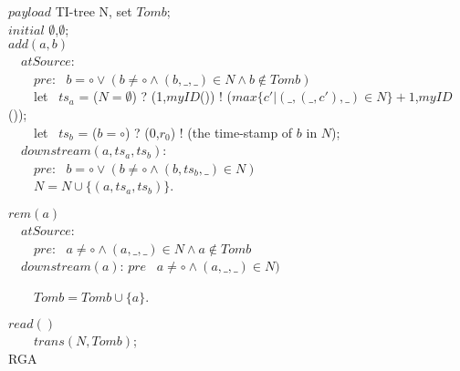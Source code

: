 \renewcommand{\algorithmcfname}{CRDT Implementation}
\noindent
\noindent\begin{algorithm}[H]
$\mathit{payload}$ TI-tree N, set $\mathit{Tomb}$; \\
$\mathit{initial}$ $\emptyset$,$\emptyset$; \\

$add(a,b)$ \\
\ \ $\mathit{atSource}$: \\
\ \ \ \ $\mathit{pre}$: \ $b = \circ \vee ( b \neq \circ \wedge (b,\_,\_) \in N \wedge b \notin \mathit{Tomb})$ \\



\ \ \ \ let \ $ts_a$ = ($N = \emptyset$) ? (1,$\mathit{myID}$()) ! ($\mathit{max}\{ c' \vert (\_,(\_,c'),\_) \in N \} +1$,$\mathit{myID}$()); \\
\ \ \ \ let \ $ts_b$ = ($b = \circ$) ? (0,$r_0$) ! (the time-stamp of $b$ in $N$); \\

\ \ $\mathit{downstream}(a,ts_a,ts_b)$: \\
\ \ \ \ $\mathit{pre}$: \ $b = \circ \vee ( b \neq \circ \wedge (b,ts_b,\_) \in N)$ \\

\ \ \ \ $N = N \cup \{ (a,ts_a,ts_b) \}$.


$rem(a)$ \\
\ \ $\mathit{atSource}$: \\
\ \ \ \ $\mathit{pre}$: \ $a \neq \circ \wedge (a,\_,\_) \in N \wedge a \notin \mathit{Tomb}$ \\

\ \ $\mathit{downstream}(a)$: $\mathit{pre}$ \ $a \neq \circ \wedge (a,\_,\_) \in N)$

\ \ \ \ $\mathit{Tomb} = \mathit{Tomb} \cup \{ a \}$.

$read()$ \\
\ \ \ \ \KwRet $\mathit{trans}(N,\mathit{Tomb})$; \\

\caption{RGA}
\label{Method1}
\end{algorithm}

